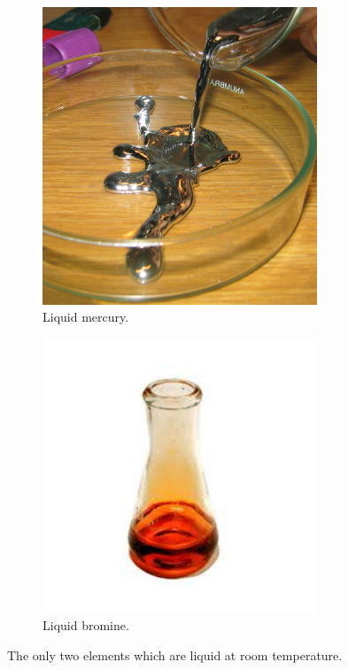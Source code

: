\documentclass[a4paper]{memoir}
\begin{document}
\begin{figure}
  \centering
  \begin{subfigure}[t]{0.45\textwidth}
    \centering
    \includegraphics[width=0.9\textwidth]{mercury}
    \caption{Liquid mercury.}
  \end{subfigure}%
  \begin{subfigure}[t]{0.45\textwidth}
    \centering
    \includegraphics[width=0.9\textwidth]{bromine}
    \caption{Liquid bromine.}
  \end{subfigure}
  \caption{The only two elements which are liquid at room temperature. \label{fig:merbro}}
\end{figure}
\end{document}
